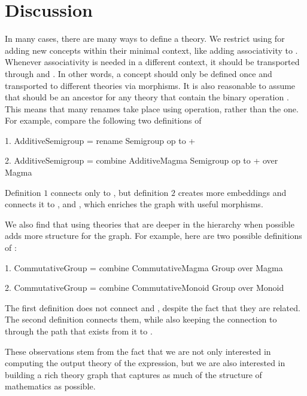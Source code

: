 \section{Discussion}
\label{sec:library:discussion}
In many cases, there are many ways to define a theory. We restrict using  for adding new concepts within their minimal context, like adding associativity to . Whenever associativity is needed in a different context, it should be transported through  and . In other words, a concept should only be defined once and transported to different theories via morphisms. It is also reasonable to assume that  should be an ancestor for any theory that contain the binary {operation \lstmath{+}}. This means that many renames take place using  operation, rather than the  one. For example, compare the following two definitions of  
\begin{togcode}
1. AdditiveSemigroup = rename Semigroup {op to +}
\end{togcode}
\begin{togcode}
2. AdditiveSemigroup = 
       combine AdditiveMagma {} Semigroup {op to +} over Magma 
\end{togcode}
Definition $1$ connects  only to , but definition $2$ creates more embeddings and connects it to ,  and , which enriches the graph with useful morphisms. 

We also find that using theories that are deeper in the hierarchy when possible adds more structure for the graph. For example, here are two possible definitions of :    
\begin{togcode} 
1. CommutativeGroup = 
       combine CommutativeMagma {} Group {} over Magma
\end{togcode} 
\begin{togcode}
2. CommutativeGroup = 
       combine CommutativeMonoid {} Group {} over Monoid
\end{togcode}
The first definition does not connect  and , despite the fact that they are related. The second definition connects them, while also keeping the connection to  through the path that exists from it to . 

These observations stem from the fact that we are not only interested in computing the output theory of the expression, but we are also interested in building a rich theory graph that captures as much of the structure of mathematics as possible. 

